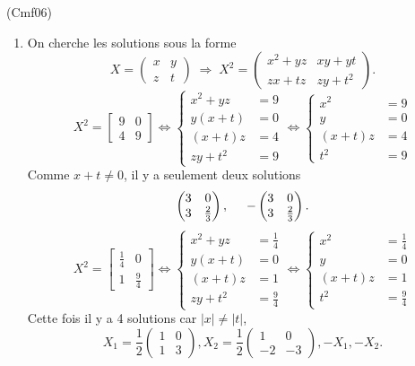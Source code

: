 \begin{tiny}(Cmf06)\end{tiny}
\begin{enumerate}
 \item On cherche les solutions sous la forme
\[
 X =
\begin{pmatrix}
 x & y \\ z &t
\end{pmatrix} \; \Rightarrow \;
 X^2 =
\begin{pmatrix}
 x^2 + yz & xy + yt \\ zx + tz & zy + t^2
\end{pmatrix}.
\]
\[
 X ^2 = \begin{bmatrix}
 9 & 0 \\
 4 & 9
\end{bmatrix}
\Leftrightarrow
\left\lbrace 
\begin{aligned}
x^2 + yz &= 9 \\
y(x+t) &= 0\\
(x+t)z &= 4 \\
zy + t^2 &= 9
\end{aligned}
\right. 
\Leftrightarrow
\left\lbrace 
\begin{aligned}
x^2  &= 9 \\
y &= 0\\
(x+t)z &= 4 \\
t^2 &= 9
\end{aligned}
\right. 
\]
Comme $x+t \neq 0$, il y a seulement deux solutions
\[
 \begin{pmatrix}
  3 & 0 \\ 3 & \frac{2}{3}
 \end{pmatrix}, \hspace{0.5cm}
 - \begin{pmatrix}
  3 & 0 \\ 3 & \frac{2}{3}
 \end{pmatrix}.
\]
\[
 X ^2 = \begin{bmatrix}
 \frac{1}{4} & 0 \\
 1 & \frac{9}{4}
\end{bmatrix}
\Leftrightarrow
\left\lbrace 
\begin{aligned}
x^2 + yz &= \frac{1}{4} \\
y(x+t) &= 0\\
(x+t)z &= 1 \\
zy + t^2 &= \frac{9}{4}
\end{aligned}
\right. 
\Leftrightarrow
\left\lbrace 
\begin{aligned}
x^2  &= \frac{1}{4} \\
y &= 0\\
(x+t)z &= 1 \\
t^2 &= \frac{9}{4}
\end{aligned}
\right. 
\]
Cette fois il y a 4 solutions car $|x| \neq |t|$, 
\[
X_1 = \frac{1}{2}\begin{pmatrix}
  1 & 0 \\ 1 & 3
 \end{pmatrix}, 
X_2 = \frac{1}{2}\begin{pmatrix}
  1 & 0 \\ -2 & -3
 \end{pmatrix}, 
- X_1,  -X_2.
\]


\end{enumerate}
